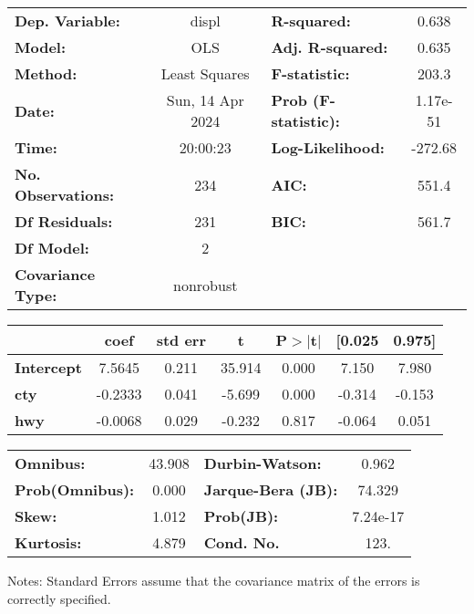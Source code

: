 \begin{center}
\begin{tabular}{lclc}
\toprule
\textbf{Dep. Variable:}    &      displ       & \textbf{  R-squared:         } &     0.638   \\
\textbf{Model:}            &       OLS        & \textbf{  Adj. R-squared:    } &     0.635   \\
\textbf{Method:}           &  Least Squares   & \textbf{  F-statistic:       } &     203.3   \\
\textbf{Date:}             & Sun, 14 Apr 2024 & \textbf{  Prob (F-statistic):} &  1.17e-51   \\
\textbf{Time:}             &     20:00:23     & \textbf{  Log-Likelihood:    } &   -272.68   \\
\textbf{No. Observations:} &         234      & \textbf{  AIC:               } &     551.4   \\
\textbf{Df Residuals:}     &         231      & \textbf{  BIC:               } &     561.7   \\
\textbf{Df Model:}         &           2      & \textbf{                     } &             \\
\textbf{Covariance Type:}  &    nonrobust     & \textbf{                     } &             \\
\bottomrule
\end{tabular}
\begin{tabular}{lcccccc}
                   & \textbf{coef} & \textbf{std err} & \textbf{t} & \textbf{P$> |$t$|$} & \textbf{[0.025} & \textbf{0.975]}  \\
\midrule
\textbf{Intercept} &       7.5645  &        0.211     &    35.914  &         0.000        &        7.150    &        7.980     \\
\textbf{cty}       &      -0.2333  &        0.041     &    -5.699  &         0.000        &       -0.314    &       -0.153     \\
\textbf{hwy}       &      -0.0068  &        0.029     &    -0.232  &         0.817        &       -0.064    &        0.051     \\
\bottomrule
\end{tabular}
\begin{tabular}{lclc}
\textbf{Omnibus:}       & 43.908 & \textbf{  Durbin-Watson:     } &    0.962  \\
\textbf{Prob(Omnibus):} &  0.000 & \textbf{  Jarque-Bera (JB):  } &   74.329  \\
\textbf{Skew:}          &  1.012 & \textbf{  Prob(JB):          } & 7.24e-17  \\
\textbf{Kurtosis:}      &  4.879 & \textbf{  Cond. No.          } &     123.  \\
\bottomrule
\end{tabular}
\end{center}

Notes: \newline
 [1] Standard Errors assume that the covariance matrix of the errors is correctly specified.